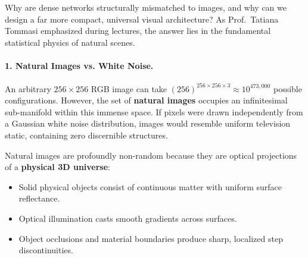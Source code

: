 Why are dense networks structurally mismatched to images, and why can we design a far more compact, universal visual architecture? As Prof.~Tatiana Tommasi emphasized during lectures, the answer lies in the fundamental statistical physics of natural scenes.

\paragraph{1. Natural Images vs. White Noise.}
An arbitrary $256 \times 256$ RGB image can take $(256)^{256 \times 256 \times 3} \approx 10^{473,000}$ possible configurations. However, the set of \textbf{natural images} occupies an infinitesimal sub-manifold within this immense space. If pixels were drawn independently from a Gaussian white noise distribution, images would resemble uniform television static, containing zero discernible structures.

Natural images are profoundly non-random because they are optical projections of a \textbf{physical 3D universe}:
\begin{itemize}[noitemsep]
  \item Solid physical objects consist of continuous matter with uniform surface reflectance.
  \item Optical illumination casts smooth gradients across surfaces.
  \item Object occlusions and material boundaries produce sharp, localized step discontinuities.
\end{itemize}

